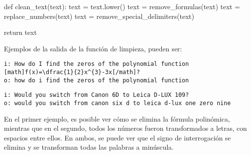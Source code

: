 \bigskip

\begin{python}[caption={Ejemplo de función de limpieza.}, captionpos=b,label={lst:funcion-limpieza}]
def clean_text(text):
	text = text.lower()
	text = remove_formulas(text)
	text = replace_numbers(text)
	text = remove_special_delimiters(text)

	return text
\end{python}

\bigskip Ejemplos de la salida de la función de limpieza, pueden ser:

\begin{verbatim}
i: How do I find the zeros of the polynomial function
[math]f(x)=\dfrac{1}{2}x^{3}-3x[/math]?
o: how do i find the zeros of the polynomial function
\end{verbatim}

\begin{verbatim}
i: Would you switch from Canon 6D to Leica D-LUX 109?
o: would you switch from canon six d to leica d-lux one zero nine
\end{verbatim}

En el primer ejemplo, es posible ver cómo se elimina la fórmula polinómica, mientras que en el segundo, todos los números fueron transformados a letras, con espacios entre ellos. En ambos, se puede ver que el signo de interrogación se elimina y se transforman todas las palabras a minúscula.

